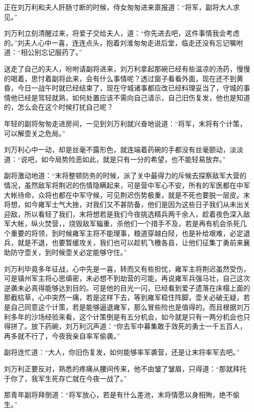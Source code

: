 正在刘万利和夫人肝肠寸断的时候，侍女匆匆进来禀报道：“将军，副将大人求见。”

刘万利立刻清醒过来，将爱子交给夫人，道：“你先进去吧，这件事情我会考虑的。”刘夫人心中一喜，连连点头，抱着刘淮匆匆走进后堂，临走还没有忘记嘱咐道：“相公别忘记服药了。”

送走了自己的夫人，吩咐请副将进来，刘万利拿起那碗已经有些温凉的汤药，慢慢的喝着，思忖着副将此来，会有什么事情呢？透过窗子看看外面，现在还不到黄昏，今日一战午时就已经结束了，现在守城诸事都应改已经料理妥当了，守城的事情他已经是驾轻就熟，如何处置应该不需向自己请示，自己旧伤复发，他也是知道的，怎么会在这个时候打扰自己呢？

年轻的副将匆匆走进房间，一见到刘万利就兴奋地说道：“将军，末将有个计策，可以解壶关之危局。”

刘万利心中一动，却是丝毫不露形色，就连端着药碗的手都没有丝毫颤动，淡淡道：“说吧，如今局势险恶如此，就是只有一分的希望，也不能轻易放弃。”

副将激动地道：“末将整顿防务的时候，派了关中最得力的斥候去探察敌军大营的情况，虽然敌军将荆迟的伤情隐瞒起来，可是营中军心不安，所有的军医都在中军大帐待命，众将也都在中军守候，可见荆迟伤势极重，就是不死也要脱一层皮。末将想，如今雍军士气大挫，对我们又不甚防备，他们是因为这些日子我们从未出关迎敌，所以看轻了我们，末将想若是我们今夜挑选精兵两千余人，趁着夜色深入敌军大帐，纵火焚营，，烧毁敌军辎重，杀他们一个措手不及，若是再有机会杀死几个重要的将领，到时候雍军主将不能理事，粮道穿越白陉，也是补给艰难，必定退兵，就是不退，也要暂缓攻关，我们也可以趁机飞檄各县，让他们征集丁勇前来襄助防守壶关，到时候壶关必定能够守住。”

刘万利毕竟多年征战，心中先是一喜，转而又有些担忧，雍军主将荆迟虽然受伤，可是镇州军主将心思缜密，未必想不到劫营的可能，再说雍军兵强马壮，自己这次逆袭未必真得能够达到目的。可是他的目光一闪，已经看到爱子遗落在床榻上面的那截枯草，心中突然一痛，若是这样下去，等到雍军稳住阵脚，壶关必破无疑，若是自己同意这个计策，若是能够逼退雍军，那么冒些险也是值得的。而且根据刘万利多年的沙场经验来看，这个计策倒是有五分机会，如今就是只有一两分机会也只得拼了。放下药碗，刘万利沉声道：“你去军中募集敢于效死的勇士一千五百人，再多就不行了，今夜我亲自率军偷袭。”

副将连忙道：“大人，你旧伤复发，如何能够率军袭营，还是让末将率军去吧。”

刘万利正要反对，熟悉的疼痛从腰间传来，他不由皱了皱眉，只得道：“那就拜托于你了，我军生死存亡就在今夜一战了。”

那青年副将拜倒道：“将军放心，若是有什么差池，末将情愿以身相殉，绝不偷生。”


